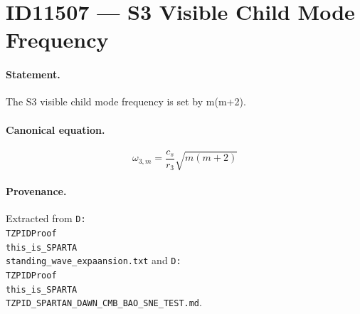 \section*{ID11507 --- S3 Visible Child Mode Frequency}

\paragraph{Statement.}
The S3 visible child mode frequency is set by m(m+2).

\paragraph{Canonical equation.}
\[
\omega_{3,m}=\frac{c_s}{r_3}\sqrt{m(m+2)}
\]

\paragraph{Provenance.}
Extracted from \texttt{D:\\TZPIDProof\\this\_is\_SPARTA\\standing\_wave\_expaansion.txt} and \texttt{D:\\TZPIDProof\\this\_is\_SPARTA\\TZPID\_SPARTAN\_DAWN\_CMB\_BAO\_SNE\_TEST.md}.
